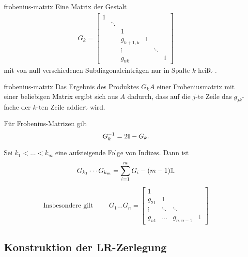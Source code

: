 \begin{Definition}{frobenius-matrix}
  Eine Matrix der Gestalt
  \begin{gather}
    G_k=\begin{bmatrix}
      1 & & & & & \\
      &\ddots & & & & \\
      &   & 1& & &\\
      &   & g_{k+1,k}&1 & &\\
      &   & \vdots& &\ddots &\\
      &   & g_{nk}& & &1
    \end{bmatrix}
  \end{gather}
  mit von null verschiedenen Subdiagonaleinträgen nur in Spalte $k$
  heißt .
\end{Definition}

\begin{Lemma}{frobenius-matrix}
  Das Ergebnis des Produktes $G_kA$ einer Frobeniusmatrix mit einer
  beliebigen Matrix ergibt sich aus $A$ dadurch, dass auf die $j$-te
  Zeile das $g_{jk}$-fache der $k$-ten Zeile addiert wird.

  Für Frobenius-Matrizen gilt
  \begin{gather}
    G_k^{-1} = 2\mathbb I-G_k.
  \end{gather}
  
  Sei $k_1<\dots<k_m$ eine aufsteigende Folge von Indizes. Dann ist
  \begin{gather}
    G_{k_1}\cdots G_{k_m} = \sum_{i=1}^m G_i - (m-1) \mathbb I.
  \end{gather}
  \begin{gather}
    \text{Insbesondere gilt }\qquad
    G_1\dots G_n =
    \begin{bmatrix}
      1\\
      g_{21} & 1 \\
      \vdots & \ddots & \ddots \\
      g_{n1}  & \dots & g_{n,n-1} & 1
    \end{bmatrix}
  \end{gather}
\end{Lemma}

\subsection{Konstruktion der LR-Zerlegung}

